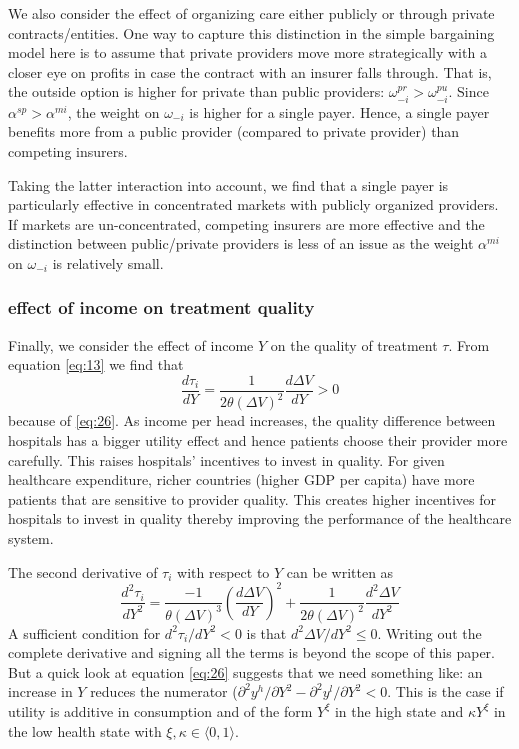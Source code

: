 \documentclass{article}
\begin{document}
We also consider the effect of organizing care either publicly or through private contracts/entities. One way to capture this distinction in the simple bargaining model here is to assume that private providers move more strategically with a closer eye on profits in case the contract with an insurer falls through. That is, the outside option is higher for private than public providers: \(\omega_{-i}^{pr} > \omega_{-i}^{pu}\). Since \(\alpha^{sp}>\alpha^{mi}\), the weight on \(\omega_{-i}\) is higher for a single payer. Hence, a single payer benefits more from a public provider (compared to private provider) than competing insurers.

Taking the latter interaction into account, we find that a single payer is particularly effective in concentrated markets with publicly organized providers. If markets are un-concentrated, competing insurers are more effective and the distinction between public/private providers is less of an issue as the weight \(\alpha^{mi}\) on \(\omega_{-i}\) is relatively small.

\subsubsection{effect of income on treatment quality}
\label{sec:orga98123f}

Finally, we consider the effect of income \(Y\) on the quality of treatment \(\tau\). From equation \eqref{eq:13} we find that
\begin{equation}
\label{eq:29}
\frac{d\tau_i}{dY} = \frac{1}{2\theta (\Delta V)^2}\frac{d \Delta V}{dY} > 0
\end{equation}
because of \eqref{eq:26}. As income per head increases, the quality difference between hospitals has a bigger utility effect and hence patients choose their provider more carefully. This raises hospitals' incentives to invest in quality. For given healthcare expenditure, richer countries (higher GDP per capita) have more patients that are sensitive to provider quality. This creates higher incentives for hospitals to invest in quality thereby improving the performance of the healthcare system.

The second derivative of \(\tau_i\) with respect to \(Y\) can be written as
\begin{equation}
\label{eq:30}
\frac{d^{2}\tau_i}{dY^{2}} = \frac{-1}{\theta (\Delta V)^3} \left(\frac{d \Delta V}{dY}\right)^2 +\frac{1}{2\theta (\Delta V)^2} \frac{d^2 \Delta V}{dY^2}
\end{equation}
A sufficient condition for \(d^2 \tau_i/dY^2 <0\) is that \(d^2 \Delta V/dY^2 \leq 0\). Writing out the complete derivative and signing all the terms is beyond the scope of this paper. But a quick look at equation \eqref{eq:26} suggests that we need something like: an increase in \(Y\) reduces the numerator (\(\partial^2 y^h/\partial Y^2 -\partial^2 y^l/\partial Y^2<0\). This is the case if utility is additive in consumption and of the form \(Y^{\xi}\) in the high state and \(\kappa Y^{\xi}\) in the low health state with \(\xi,\kappa \in \langle 0,1\rangle\). 
\end{document}
